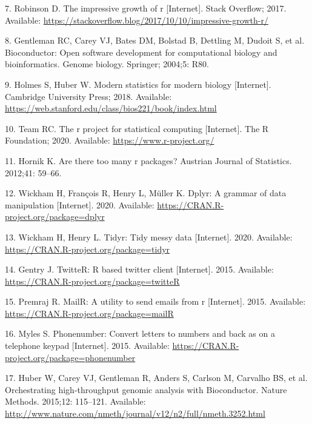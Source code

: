 \documentclass[10pt,letterpaper]{article}
\begin{document}
\leavevmode\hypertarget{ref-robinson2017}{}%
7. Robinson D. The impressive growth of r {[}Internet{]}. Stack
Overflow; 2017. Available:
\url{https://stackoverflow.blog/2017/10/10/impressive-growth-r/}

\leavevmode\hypertarget{ref-gentleman2004}{}%
8. Gentleman RC, Carey VJ, Bates DM, Bolstad B, Dettling M, Dudoit S, et
al. Bioconductor: Open software development for computational biology
and bioinformatics. Genome biology. Springer; 2004;5: R80.

\leavevmode\hypertarget{ref-holmes2018}{}%
9. Holmes S, Huber W. Modern statistics for modern biology
{[}Internet{]}. Cambridge University Press; 2018. Available:
\url{https://web.stanford.edu/class/bios221/book/index.html}

\leavevmode\hypertarget{ref-Rproject2020}{}%
10. Team RC. The r project for statistical computing {[}Internet{]}. The
R Foundation; 2020. Available: \url{https://www.r-project.org/}

\leavevmode\hypertarget{ref-hornik2012}{}%
11. Hornik K. Are there too many r packages? Austrian Journal of
Statistics. 2012;41: 59--66.

\leavevmode\hypertarget{ref-dplyr}{}%
12. Wickham H, François R, Henry L, Müller K. Dplyr: A grammar of data
manipulation {[}Internet{]}. 2020. Available:
\url{https://CRAN.R-project.org/package=dplyr}

\leavevmode\hypertarget{ref-tidyr}{}%
13. Wickham H, Henry L. Tidyr: Tidy messy data {[}Internet{]}. 2020.
Available: \url{https://CRAN.R-project.org/package=tidyr}

\leavevmode\hypertarget{ref-twitteR}{}%
14. Gentry J. TwitteR: R based twitter client {[}Internet{]}. 2015.
Available: \url{https://CRAN.R-project.org/package=twitteR}

\leavevmode\hypertarget{ref-mailR}{}%
15. Premraj R. MailR: A utility to send emails from r {[}Internet{]}.
2015. Available: \url{https://CRAN.R-project.org/package=mailR}

\leavevmode\hypertarget{ref-phonenumber}{}%
16. Myles S. Phonenumber: Convert letters to numbers and back as on a
telephone keypad {[}Internet{]}. 2015. Available:
\url{https://CRAN.R-project.org/package=phonenumber}

\leavevmode\hypertarget{ref-bioCproject}{}%
17. Huber W, Carey VJ, Gentleman R, Anders S, Carlson M, Carvalho BS, et
al. Orchestrating high-throughput genomic analysis with Bioconductor.
Nature Methods. 2015;12: 115--121. Available:
\url{http://www.nature.com/nmeth/journal/v12/n2/full/nmeth.3252.html}
\end{document}
